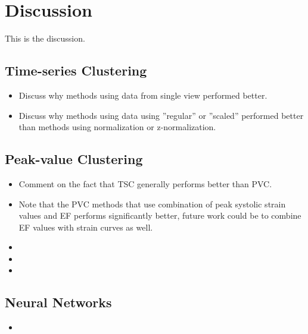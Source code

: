 \chapter{Discussion}

This is the discussion. \bigskip

\section{Time-series Clustering}

\begin{itemize}
    \item Discuss why methods using data from single view performed better.
    \item Discuss why methods using data using ''regular'' or ''scaled'' performed better than methods using normalization or z-normalization.
\end{itemize}

\section{Peak-value Clustering}

\begin{itemize}
    \item Comment on the fact that TSC generally performs better than PVC.
    \item Note that the PVC methods that use combination of peak systolic strain values and EF performs significantly better, future work could be to combine EF values with strain curves as well.
    \item 
    \item 
    \item 
\end{itemize}

\section{Neural Networks}

\begin{itemize}
    \item 
\end{itemize}
